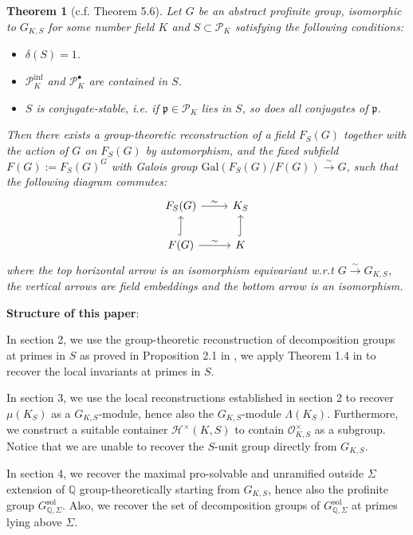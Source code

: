 \documentclass{article}
\newtheorem{thm}{Theorem}[section]
\theoremstyle{plain}
\theoremstyle{definition}
\theoremstyle{remark}
\begin{document}
\begin{thm}[c.f. Theorem 5.6]
Let $G$ be an abstract profinite group, isomorphic to $G_{K,S}$ for some number field $K$ and $S \subset \mathscr{P}_K$ satisfying the following conditions: \par 
\begin{itemize}
    \item $\delta(S) = 1$.
    \item $\mathscr{P}_K^{\text{inf}}$ and $\mathscr{P}_K^{\bullet}$ are contained in $S$. 
    \item $S$ is conjugate-stable, i.e. if $\mathfrak{p} \in \mathscr{P}_K$ lies in $S$, so does all conjugates of $\mathfrak{p}$. 
\end{itemize}
Then there exists a group-theoretic reconstruction of a field $F_S(G)$ together with the action of $G$ on $F_S(G)$ by automorphism, and the fixed subfield $F(G) := F_S(G)^G$ with Galois group $\text{Gal}(F_S(G)/F(G)) \xrightarrow{\sim} G$, such that the following diagram commutes:
$$
\begin{tikzcd}
F_S(G) \arrow[r,"\sim"] & K_S \\
F(G) \arrow[r,"\sim"] \arrow[u,hookrightarrow] & K \arrow[u,hookrightarrow]
\end{tikzcd}
$$
where the top horizontal arrow is an isomorphism equivariant w.r.t $G \xrightarrow{\sim} G_{K,S}$, the vertical arrows are field embeddings and the bottom arrow is an isomorphism.
\end{thm} 
\textbf{Structure of this paper}: \par 
In section 2, we use the group-theoretic reconstruction of decomposition groups at primes in $S$ as proved in Proposition 2.1 in \cite{Shi1}, we apply Theorem 1.4 in \cite{Ho1} to recover the local invariants at primes in $S$. \par 
In section 3, we use the local reconstructions established in section 2 to recover $\mu(K_S)$ as a $G_{K,S}$-module, hence also the $G_{K,S}$-module $\Lambda(K_S)$. Furthermore, we construct a suitable container $\mathcal{H}^{\times}(K,S)$ to contain $\mathcal{O}_{K,S}^{\times}$ as a subgroup. Notice that we are unable to recover the $S$-unit group directly from $G_{K,S}$. \par 
In section 4, we recover the maximal pro-solvable and unramified outside $\Sigma$ extension of $\mathbb Q$ group-theoretically starting from $G_{K,S}$, hence also the profinite group $G_{\mathbb Q,\Sigma}^{\text{sol}}$. Also, we recover the set of decomposition groups of $G_{\mathbb Q,\Sigma}^{\text{sol}}$ at primes lying above $\Sigma$. \par 
\end{document}
